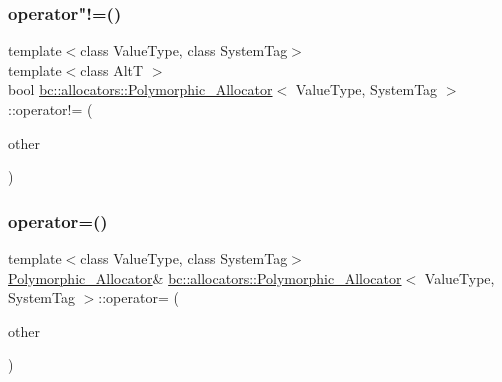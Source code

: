 \mbox{\label{structbc_1_1allocators_1_1Polymorphic__Allocator_aa1a0c441f9204498a7bae488884488a4}} 
\subsubsection{\texorpdfstring{operator"!=()}{operator!=()}}
{\footnotesize\ttfamily template$<$class Value\+Type, class System\+Tag$>$ \\
template$<$class AltT $>$ \\
bool \hyperlink{structbc_1_1allocators_1_1Polymorphic__Allocator}{bc\+::allocators\+::\+Polymorphic\+\_\+\+Allocator}$<$ Value\+Type, System\+Tag $>$\+::operator!= (\begin{DoxyParamCaption}\item[{const \hyperlink{structbc_1_1allocators_1_1Polymorphic__Allocator}{Polymorphic\+\_\+\+Allocator}$<$ AltT, \hyperlink{structbc_1_1allocators_1_1Polymorphic__Allocator_a8036f2439226926f10176abbe9ef6f9d}{system\+\_\+tag} $>$ \&}]{other }\end{DoxyParamCaption})\hspace{0.3cm}{\ttfamily [inline]}}

\mbox{\label{structbc_1_1allocators_1_1Polymorphic__Allocator_ab39a8d3c81d7cfee0936a6468a733457}} 
\subsubsection{\texorpdfstring{operator=()}{operator=()}\hspace{0.1cm}{\footnotesize\ttfamily [1/2]}}
{\footnotesize\ttfamily template$<$class Value\+Type, class System\+Tag$>$ \\
\hyperlink{structbc_1_1allocators_1_1Polymorphic__Allocator}{Polymorphic\+\_\+\+Allocator}\& \hyperlink{structbc_1_1allocators_1_1Polymorphic__Allocator}{bc\+::allocators\+::\+Polymorphic\+\_\+\+Allocator}$<$ Value\+Type, System\+Tag $>$\+::operator= (\begin{DoxyParamCaption}\item[{const \hyperlink{structbc_1_1allocators_1_1Polymorphic__Allocator}{Polymorphic\+\_\+\+Allocator}$<$ Value\+Type, System\+Tag $>$ \&}]{other }\end{DoxyParamCaption})\hspace{0.3cm}{\ttfamily [inline]}}

